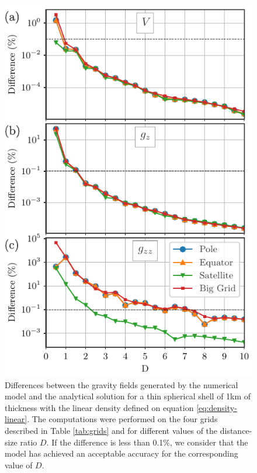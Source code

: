 \documentclass[extra]{gji}
\begin{document}
\begin{figure}
\centering
\includegraphics[width=0.9\linewidth]{figures/Dlinear-thin-differences.pdf}
\caption{
    Differences between the gravity fields generated by the numerical model and the analytical solution for a thin spherical shell of 1km of thickness with the linear density defined on equation \ref{eq:density-linear}. The computations were performed on the four grids described in Table \ref{tab:grids} and for different values of the distance-size ratio $D$. If the difference is less than 0.1\%, we consider that the model has achieved an acceptable accuracy for the corresponding value of $D$.
}
\label{fig:D-linear-thin}
\end{figure}
\end{document}
